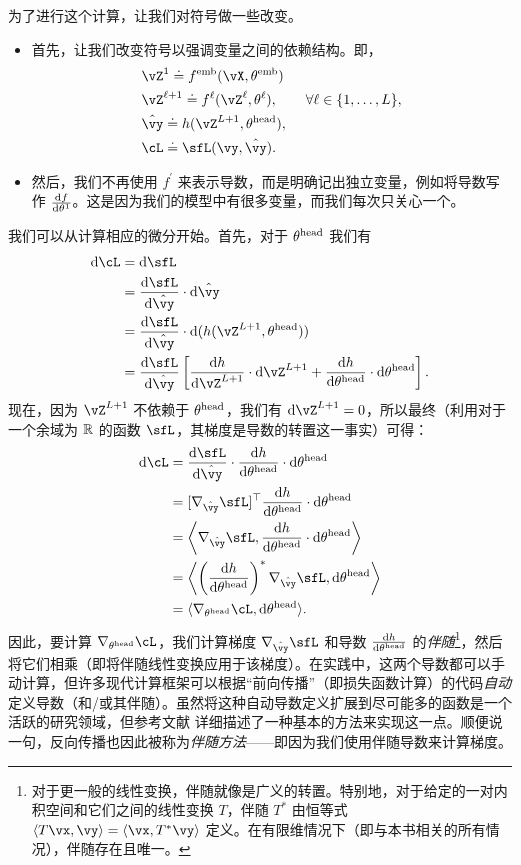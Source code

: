 \documentclass[../../book-main.tex]{subfiles}
\begin{document}
为了进行这个计算，让我们对符号做一些改变。
\begin{itemize}
    \item 首先，让我们改变符号以强调变量之间的依赖结构。即，
    \begin{align}
        &\vZ^{1} \doteq f^{\emb}(\vX, \theta^{\emb}) \\ 
        &\vZ^{\ell + 1} \doteq f^{\ell}(\vZ^{\ell}, \theta^{\ell}), \qquad \forall \ell \in \{1, \dots, L\}, \\
        &\hat{\vy} \doteq h(\vZ^{L+1}, \theta^{\head}), \\ 
        &\cL \doteq \sfL(\vy, \hat{\vy}).
    \end{align}
    \item 然后，我们不再使用 \(f^{\prime}\) 来表示导数，而是明确记出独立变量，例如将导数写作 \(\odv{f}{\theta^{1}}\)。这是因为我们的模型中有很多变量，而我们每次只关心一个。
\end{itemize}
我们可以从计算相应的微分开始。首先，对于 \(\theta^{\mathrm{head}}\) 我们有
\begin{align}
    \odif{\cL}
    &= \odif{\sfL} \\ 
    &= \odv{\sfL}{\hat{\vy}}\cdot\odif{\hat{\vy}} \\ 
    &= \odv{\sfL}{\hat{\vy}}\cdot\odif{{(h(\vZ^{L + 1}, \theta^{\head}))}} \\ 
    &= \odv{\sfL}{\hat{\vy}}\bs{\odv{h}{\vZ^{L + 1}}\cdot\odif{\vZ}^{L + 1} + \odv{h}{\theta^{\head}}\cdot\odif{\theta}^{\head}}.
\end{align}
现在，因为 \(\vZ^{L + 1}\) 不依赖于 \(\theta^{\mathrm{head}}\)，我们有 \(\odif{\vZ}^{L + 1} = 0\)，所以最终（利用对于一个余域为 \(\mathbb{R}\) 的函数 \(\sfL\)，其梯度是导数的转置这一事实）可得：
\begin{align}
    \odif{\cL} 
    &= \odv{\sfL}{\hat{\vy}}\cdot\odv{h}{\theta^{\head}}\cdot\odif{\theta}^{\head} \\ 
    &= [\nabla_{\hat{\vy}}\sfL]^{\top}\odv{h}{\theta^{\head}}\cdot\odif{\theta}^{\head} \\ 
    &= \ip*{\nabla_{\hat{\vy}}\sfL}{\odv{h}{\theta^{\head}}\cdot\odif{\theta}^{\head}} \\
    &= \ip*{\bp{\odv{h}{\theta^{\head}}}^{*}\nabla_{\hat{\vy}}\sfL}{\odif{\theta}^{\head}} \\ 
    &= \ip{\nabla_{\theta^{\head}}\cL}{\odif{\theta}^{\head}}.
\end{align}
因此，要计算 \(\nabla_{\theta^{\head}}\cL\)，我们计算梯度 \(\nabla_{\hat{\vy}}\sfL\) 和导数 \(\odv{h}{\theta^{\head}}\) 的\textit{伴随}\footnote{对于更一般的线性变换，伴随就像是广义的转置。特别地，对于给定的一对内积空间和它们之间的线性变换 \(T\)，伴随 \(T^{*}\) 由恒等式 \(\ip{T\vx}{\vy} = \ip{\vx}{T^{*}\vy}\) 定义。在有限维情况下（即与本书相关的所有情况），伴随存在且唯一。}，然后将它们相乘（即将伴随线性变换应用于该梯度）。在实践中，这两个导数都可以手动计算，但许多现代计算框架可以根据“前向传播”（即损失函数计算）的代码\textit{自动}定义导数（和/或其伴随）。虽然将这种自动导数定义扩展到尽可能多的函数是一个活跃的研究领域，但参考文献 \cite{bright2025matrix} 详细描述了一种基本的方法来实现这一点。顺便说一句，反向传播也因此被称为\textit{伴随方法}——即因为我们使用伴随导数来计算梯度。
\end{document}
